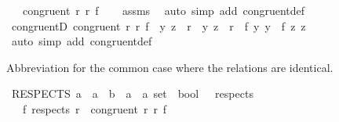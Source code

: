 \begin{isabellebody}
\ \ \ {\isachardoublequoteopen}congruent{}\ r{}\ r{}\ f{\isachardoublequoteclose}\isanewline
%
\isadelimproof
\ \ %
\endisadelimproof
%
\isatagproof
{}\isamarkupfalse%
\ assms\ \isamarkupfalse%
\ {\isacharparenleft}{\kern0pt}auto\ simp\ add{\isacharcolon}{\kern0pt}\ congruent{}{\isacharunderscore}{\kern0pt}def{\isacharparenright}{\kern0pt}%
\endisatagproof
{\isafoldproof}%
%
\isadelimproof
\isanewline
%
\endisadelimproof
\isanewline
{}\isamarkupfalse%
\ congruent{}D{\isacharcolon}{\kern0pt}\ {\isachardoublequoteopen}congruent{}\ r{}\ r{}\ f\ {\isasymLongrightarrow}\ {\isacharparenleft}{\kern0pt}y{}{\isacharcomma}{\kern0pt}\ z{}{\isacharparenright}{\kern0pt}\ {\isasymin}\ r{}\ {\isasymLongrightarrow}\ {\isacharparenleft}{\kern0pt}y{}{\isacharcomma}{\kern0pt}\ z{}{\isacharparenright}{\kern0pt}\ {\isasymin}\ r{}\ {\isasymLongrightarrow}\ f\ y{}\ y{}\ {\isacharequal}{\kern0pt}\ f\ z{}\ z{}{\isachardoublequoteclose}\isanewline
%
\isadelimproof
\ \ %
\endisadelimproof
%
\isatagproof
{}\isamarkupfalse%
\ {\isacharparenleft}{\kern0pt}auto\ simp\ add{\isacharcolon}{\kern0pt}\ congruent{}{\isacharunderscore}{\kern0pt}def{\isacharparenright}{\kern0pt}%
\endisatagproof
{\isafoldproof}%
%
\isadelimproof
%
\endisadelimproof
%
\begin{isamarkuptext}%
Abbreviation for the common case where the relations are identical.%
\end{isamarkuptext}\isamarkuptrue%
\isamarkupfalse%
\ RESPECTS{}{\isacharcolon}{\kern0pt}{\isacharcolon}{\kern0pt}\ {\isachardoublequoteopen}{\isacharparenleft}{\kern0pt}{\isacharprime}{\kern0pt}a\ {\isasymRightarrow}\ {\isacharprime}{\kern0pt}a\ {\isasymRightarrow}\ {\isacharprime}{\kern0pt}b{\isacharparenright}{\kern0pt}\ {\isasymRightarrow}\ {\isacharparenleft}{\kern0pt}{\isacharprime}{\kern0pt}a\ {\isasymtimes}\ {\isacharprime}{\kern0pt}a{\isacharparenright}{\kern0pt}\ set\ {\isasymRightarrow}\ bool{\isachardoublequoteclose}\ \ {\isacharparenleft}{\kern0pt}\ {\isachardoublequoteopen}respects{}{\isachardoublequoteclose}\ {}{}{\isacharparenright}{\kern0pt}\isanewline
\ \ \ {\isachardoublequoteopen}f\ respects{}\ r\ {\isasymequiv}\ congruent{}\ r\ r\ f{\isachardoublequoteclose}\isanewline

\end{isabellebody}
